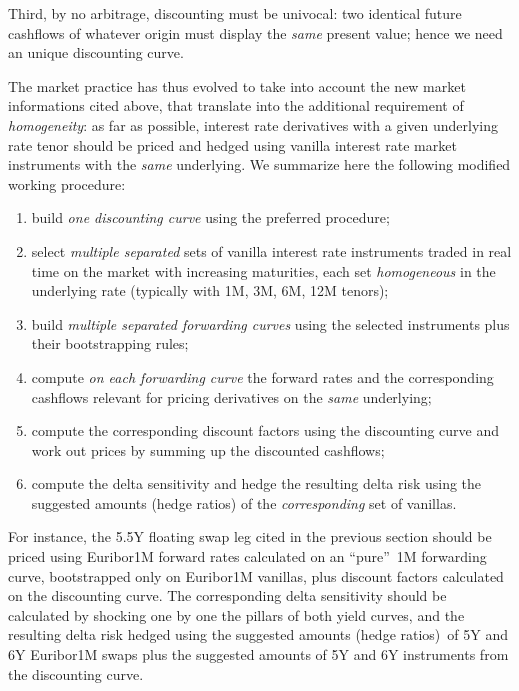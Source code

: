 \documentclass[11pt,reqno]{amsart}
\begin{document}
Third, by no arbitrage, discounting must be univocal: two identical future cashflows of whatever origin must display the \emph{same} present value; hence we need an unique discounting curve.

The market practice has thus evolved to take into account the new market informations cited above, that translate into the additional requirement of \emph{homogeneity}: as far as possible, interest rate derivatives with a given underlying rate tenor should be priced and hedged using vanilla interest rate market instruments with the \emph{same} underlying. We summarize here the following modified working procedure:

\begin{enumerate}
\item build \emph{one discounting curve} using the preferred procedure;

\item select \emph{multiple separated} sets of vanilla interest rate instruments traded in real time on the market with increasing maturities, each set \emph{homogeneous} in the underlying rate (typically with 1M, 3M, 6M, 12M tenors);
\item build \emph{multiple separated forwarding curves} using the selected instruments plus their bootstrapping rules;
\item compute \emph{on each forwarding curve} the forward rates and the corresponding cashflows relevant for pricing derivatives on the \emph{same} underlying;
\item compute the corresponding discount factors using the discounting curve and work out prices by summing up the discounted cashflows;
\item compute the delta sensitivity and hedge the resulting delta risk using the suggested amounts (hedge ratios) of the \emph{corresponding} set of vanillas.
\end{enumerate}

For instance, the 5.5Y floating swap leg cited in the previous section should be priced using Euribor1M forward rates calculated on an \textquotedblleft pure\textquotedblright\ 1M forwarding curve, bootstrapped only on Euribor1M vanillas, plus discount factors calculated on the discounting curve. The corresponding delta sensitivity should be calculated by shocking one by one the pillars of both yield curves, and the resulting delta risk hedged using the suggested amounts (hedge ratios)\ of 5Y and 6Y Euribor1M swaps plus the suggested amounts of 5Y and 6Y instruments from the discounting curve.
\end{document}
